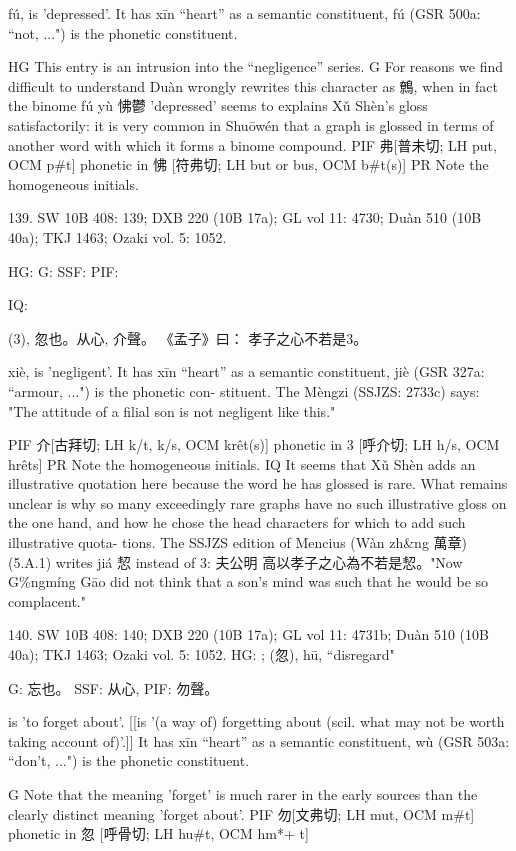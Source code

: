 fú,
is 'depressed'.
It has xīn ``heart'' as a semantic constituent,
fú (GSR 500a: ``not, ...") is the phonetic constituent.

HG This entry is an intrusion into the ``negligence'' series.
G   For reasons we find difficult to understand Duàn wrongly rewrites this character as 鷯, when in fact the binome fú yù 怫鬱 'depressed' seems to explains Xǔ Shèn's gloss satisfactorily: it is very common in Shuōwén that a graph is glossed in terms of another word with which it forms a binome compound.
PIF   弗[普未切; LH put, OCM p\#t] phonetic in 怫 [符弗切; LH but or bus, OCM b\#t(s)]
PR   Note the homogeneous initials.


139. SW 10B 408: 139; DXB 220 (10B 17a); GL vol 11: 4730; Duàn 510 (10B 40a); TKJ 1463; Ozaki vol. 5: 1052.


HG:
G: SSF: PIF:

IQ:

(3),
忽也。从心, 介聲。
《孟子》曰：
孝子之心不若是3。

xiè,
is 'negligent'.
It has xīn ``heart'' as a semantic constituent,
jiè (GSR 327a: ``armour, ...") is the phonetic con- stituent.
The Mèngzi (SSJZS: 2733c) says:
"The attitude of a filial son is not negligent like this."

PIF     介[古拜切; LH k/t, k/s, OCM krêt(s)] phonetic in 3 [呼介切; LH h/s, OCM hrêts]
PR   Note the homogeneous initials.
IQ It seems that Xǔ Shèn adds an illustrative quotation here because the word he has glossed is rare. What remains unclear is why so many exceedingly rare graphs have no such illustrative gloss on the one hand, and how he chose the head characters for which to add such illustrative quota- tions.
The SSJZS edition of Mencius (Wàn zh&ng 萬章) (5.A.1) writes jiá 恝 instead of 3: 夫公明
高以孝子之心為不若是恝。"Now G\%ngmíng Gāo did not think that a son's mind was such that he would be so complacent."



140. SW 10B 408: 140; DXB 220 (10B 17a); GL vol 11: 4731b; Duàn 510 (10B 40a); TKJ 1463; Ozaki vol. 5: 1052.
HG: ; (忽), hū, ``disregard"

G:	忘也。
SSF: 从心,
PIF: 勿聲。

is 'to forget about'. [[is '(a way of) forgetting about (scil. what may not be worth taking account of)'.]]
It has xīn ``heart'' as a semantic constituent,
wù (GSR 503a: ``don't, ...") is the phonetic constituent.

G	Note that the meaning 'forget' is much rarer in the early sources than the clearly distinct meaning 'forget about'.
PIF     勿[文弗切; LH mut, OCM m\#t] phonetic in 忽 [呼骨切; LH hu\#t, OCM hm*+ t]

